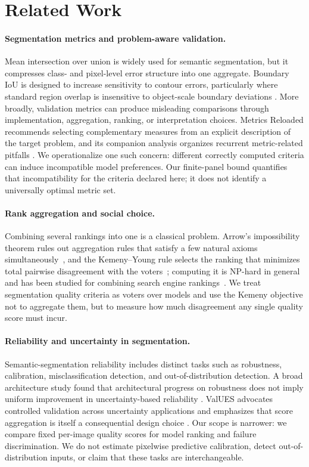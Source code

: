 \section{Related Work}

\paragraph{Segmentation metrics and problem-aware validation.}
Mean intersection over union is widely used for semantic segmentation, but it
compresses class- and pixel-level error structure into one aggregate. Boundary
IoU is designed to increase sensitivity to contour errors, particularly where
standard region overlap is insensitive to object-scale boundary deviations
\cite{cheng2021boundary}. More broadly, validation metrics can produce
misleading comparisons through implementation, aggregation, ranking, or
interpretation choices. Metrics Reloaded recommends selecting complementary
measures from an explicit description of the target problem, and its companion
analysis organizes recurrent metric-related pitfalls
\cite{maierhein2024metrics,reinke2024metrics}. We operationalize one such
concern: different correctly computed criteria can induce incompatible model
preferences. Our finite-panel bound quantifies that incompatibility for the
criteria declared here; it does not identify a universally optimal metric set.

\paragraph{Rank aggregation and social choice.}
Combining several rankings into one is a classical problem. Arrow's
impossibility theorem rules out aggregation rules that satisfy a few natural
axioms simultaneously~\cite{arrow1951social}, and the Kemeny--Young rule selects
the ranking that minimizes total pairwise disagreement with the
voters~\cite{kemeny1959mathematics,young1978consistent}; computing it is NP-hard
in general~\cite{bartholdi1989voting} and has been studied for combining search
engine rankings~\cite{dwork2001rank}. We treat segmentation quality criteria as
voters over models and use the Kemeny objective not to aggregate them, but to
measure how much disagreement any single quality score must incur.

\paragraph{Reliability and uncertainty in segmentation.}
Semantic-segmentation reliability includes distinct tasks such as robustness,
calibration, misclassification detection, and out-of-distribution detection.
A broad architecture study found that architectural progress on robustness
does not imply uniform improvement in uncertainty-based reliability
\cite{dejorge2023reliability}. ValUES advocates controlled validation across
uncertainty applications and emphasizes that score aggregation is itself a
consequential design choice \cite{kahl2024values}. Our scope is narrower: we
compare fixed per-image quality scores for model ranking and failure
discrimination. We do not estimate pixelwise predictive calibration, detect
out-of-distribution inputs, or claim that these tasks are interchangeable.

